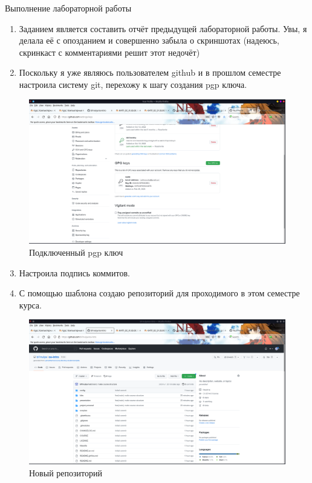 \documentclass[
  ignorenonframetext,
  aspectratio=169,
]{beamer}
\begin{document}
\begin{frame}{Выполнение лабораторной работы}
\begin{enumerate}
\item
  Заданием является составить отчёт предыдущей лабораторной работы. Увы,
  я делала её с опозданием и совершенно забыла о скриншотах (надеюсь,
  скринкаст с комментариями решит этот недочёт)
\item
  Поскольку я уже являюсь пользователем github и в прошлом семестре
  настроила систему git, перехожу к шагу создания pgp ключа.
\end{enumerate}

\begin{figure}
\hypertarget{fig:001}{%
\centering
\includegraphics[width=1\textwidth,height=\textheight]{image/1.png}
\caption{Подключенный pgp ключ}\label{fig:001}
}
\end{figure}

\begin{enumerate}
\setcounter{enumi}{2}
\item
  Настроила подпись коммитов.
\item
  С помощью шаблона создаю репозиторий для проходимого в этом семестре
  курса.
\end{enumerate}

\begin{figure}
\hypertarget{fig:002}{%
\centering
\includegraphics[width=1\textwidth,height=\textheight]{image/2.png}
\caption{Новый репозиторий}\label{fig:002}
}
\end{figure}


\end{frame}
\end{document}
